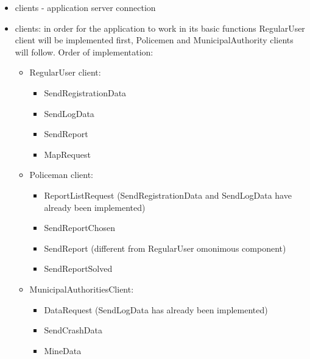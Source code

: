 \begin{itemize}
	\item clients - application server connection
	\item clients: in order for the application to work in its basic functions RegularUser client will be implemented first, Policemen and MunicipalAuthority clients will follow.\newline
	Order of implementation:
		\begin{itemize}
			\item RegularUser client:
			\begin{itemize}
				\item SendRegistrationData
				\item SendLogData
				\item SendReport
				\item MapRequest
			\end{itemize}
			\item Policeman client:
			\begin{itemize}
				\item ReportListRequest (SendRegistrationData and SendLogData have already been implemented)
				\item SendReportChosen
				\item SendReport (different from RegularUser omonimous component)
				\item SendReportSolved
			\end{itemize}
			\item MunicipalAuthoritiesClient:
				\begin{itemize}
					\item DataRequest (SendLogData has already been implemented)
					\item SendCrashData
					\item MineData
				\end{itemize} 
			\end{itemize}
	\end{itemize} 